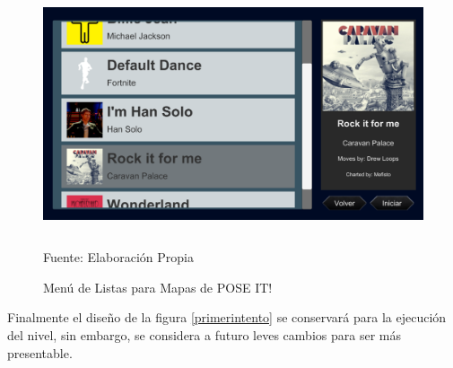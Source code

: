 \begin{figure}[t!]
	\centering
	\includegraphics[width=12cm,height=7cm]{./Images/menudelistas.png}
	\caption{Menú de Listas para Mapas de POSE IT!}
	\footnotesize Fuente: Elaboración Propia
	\label{menulistas}
\end{figure}

Finalmente el diseño de la figura \ref{primerintento} se conservará para la ejecución del nivel, sin embargo, se considera a futuro leves cambios para ser más presentable.

